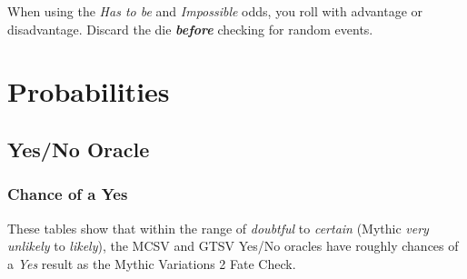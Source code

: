 \begin{DndComment}{}
When using the \emph{Has to be} and \emph{Impossible} odds, you roll with
advantage or disadvantage. Discard the die \textbf\emph{{before}}
checking for random events.
\end{DndComment}

\vfill
\appendix

\onecolumn
\chapter{Probabilities}
\section{Yes/No Oracle}
\subsection{Chance of a Yes}
These tables show that within the range of \emph{doubtful} to \emph{certain}
(Mythic \emph{very unlikely} to \emph{likely}), the MCSV and GTSV Yes/No oracles
have roughly chances of a \emph{Yes} result as the Mythic Variations 2 Fate Check.

